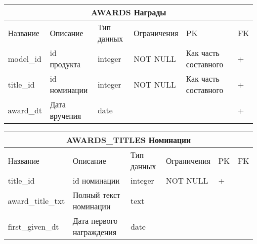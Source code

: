 \documentclass{article}
\begin{document}
\begin{tabular}{ |p{4cm}|p{4cm}|p{2.5cm}|p{3.5cm}|p{2cm}|p{1cm}| }
\hline
\multicolumn{6}{|c|}{AWARDS Награды} \\
\hline
Название & Описание & Тип данных & Ограничения & PK & FK\\
\hline
model\_id                           &   %
id продукта                         &   %
integer                             &   %
NOT NULL                            &   %
Как часть составного                &   %
 +                                  \\  %
\hline
title\_id                           &   %
id номинации                        &   %
integer                             &   %
NOT NULL                            &   %
Как часть составного                &   %
 +                                  \\  %
\hline
award\_dt                           &   %
Дата вручения                       &   %
date                                &   %
                                    &   %
                                    &   %
 +                                  \\  %
\hline
\end{tabular}

\begin{tabular}{ |p{4cm}|p{4cm}|p{2.5cm}|p{3.5cm}|p{2cm}|p{1cm}| }
\hline
\multicolumn{6}{|c|}{AWARDS\_TITLES Номинации} \\
\hline
Название & Описание & Тип данных & Ограничения & PK & FK\\
\hline
title\_id                           &   %
id номинации                        &   %
integer                             &   %
NOT NULL                            &   %
 +                                  &   %
                                    \\  %
\hline
award\_title\_txt                   &   %
Полный текст номинации              &   %
text                                &   %
                                    &   %
                                    &   %
                                    \\  %
\hline
first\_given\_dt                    &   %
Дата первого награждения            &   %
date                                &   %
                                    &   %
                                    &   %
                                    \\  %
\hline
\end{tabular}
\end{document}
